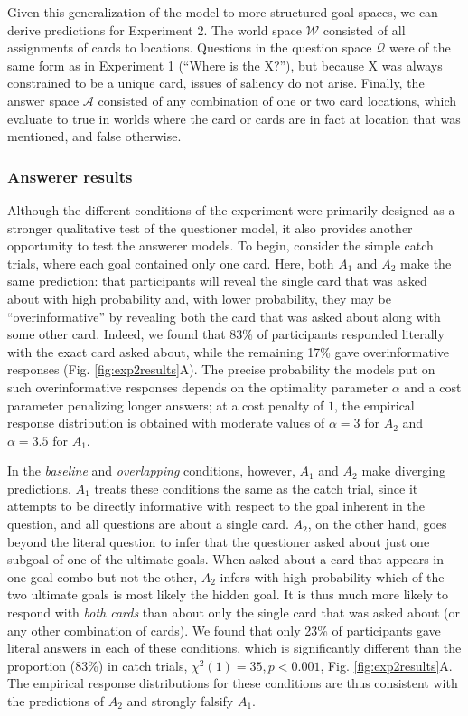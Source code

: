 \documentclass[11pt, floatsintext]{apa6}
\begin{document}
Given this generalization of the model to more structured goal spaces, we can derive predictions for Experiment 2. 
The world space $\mathcal{W}$ consisted of all assignments of cards to locations.
Questions in the question space $\mathcal{Q}$ were of the same form as in Experiment 1 (``Where is the X?''), but because X was always constrained to be a unique card, issues of saliency do not arise. 
Finally, the answer space $\mathcal{A}$ consisted of any combination of one or two card locations, which evaluate to true in worlds where the card or cards are in fact at location that was mentioned, and false otherwise.


\subsubsection{Answerer results}

Although the different conditions of the experiment were primarily designed as a stronger qualitative test of the questioner model, it also provides another opportunity to test the answerer models. 
To begin, consider the simple catch trials, where each goal contained only one card.
Here, both $A_1$ and $A_2$ make the same prediction: that participants will reveal the single card that was asked about with high probability and, with lower probability, they may be ``overinformative'' by revealing both the card that was asked about along with some other card.
Indeed, we found that 83\% of participants responded literally with the exact card asked about, while the remaining 17\% gave overinformative responses (Fig. \ref{fig:exp2results}A).
The precise probability the models put on such overinformative responses depends on the optimality parameter $\alpha$ and a cost parameter penalizing longer answers; at a cost penalty of $1$, the empirical response distribution is obtained with moderate values of $\alpha=3$ for $A_2$ and $\alpha = 3.5$ for $A_1$.

In the \emph{baseline} and \emph{overlapping} conditions, however, $A_1$ and $A_2$ make diverging predictions. 
$A_1$ treats these conditions the same as the catch trial, since it attempts to be directly informative with respect to the goal inherent in the question, and all questions are about a single card.
$A_2$, on the other hand, goes beyond the literal question to infer that the questioner asked about just one subgoal of one of the ultimate goals.
When asked about a card that appears in one goal combo but not the other, $A_2$ infers with high probability which of the two ultimate goals is most likely the hidden goal. 
It is thus much more likely to respond with \emph{both cards} than about only the single card that was asked about (or any other combination of cards). 
We found that only 23\% of participants gave literal answers in each of these conditions, which is significantly different than the proportion (83\%) in catch trials, $\chi^2(1) = 35, p < 0.001$, Fig. \ref{fig:exp2results}A.
The empirical response distributions for these conditions are thus consistent with the predictions of $A_2$ and strongly falsify $A_1$.
\end{document}
